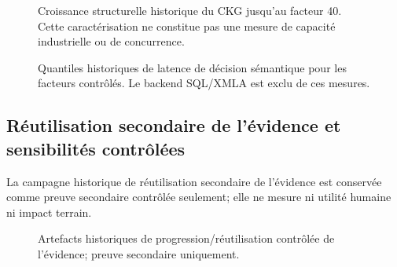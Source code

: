 \begin{figure}[!tb]
\centering

\caption{Croissance structurelle historique du CKG jusqu'au facteur 40. Cette caractérisation ne constitue pas une mesure de capacité industrielle ou de concurrence.}
\label{fig:legacy-ckg-structural}
\end{figure}



\begin{figure}[!t]
\centering
\begin{minipage}[t]{0.32\textwidth}\centering\end{minipage}\hfill
\begin{minipage}[t]{0.32\textwidth}\centering\end{minipage}\hfill
\begin{minipage}[t]{0.32\textwidth}\centering\end{minipage}
\caption{Quantiles historiques de latence de décision sémantique pour les facteurs contrôlés. Le backend SQL/XMLA est exclu de ces mesures.}
\label{fig:legacy-semantic-latency}
\end{figure}



\subsection{Réutilisation secondaire de l'évidence et sensibilités contrôlées}

La campagne historique de réutilisation secondaire de l'évidence est conservée comme preuve secondaire contrôlée seulement; elle ne mesure ni utilité humaine ni impact terrain.



\begin{figure}[!t]
\centering
\begin{minipage}[t]{0.48\textwidth}\centering\end{minipage}\hfill
\begin{minipage}[t]{0.48\textwidth}\centering\end{minipage}
\caption{Artefacts historiques de progression/réutilisation contrôlée de l'évidence; preuve secondaire uniquement.}
\label{fig:legacy-evidence-reuse}
\end{figure}

